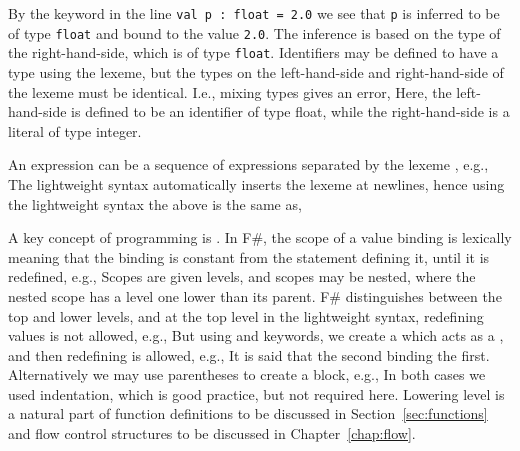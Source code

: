 By the  keyword in the line \lstinline!val p : float = 2.0! we see that \lstinline!p! is inferred to be of type \lstinline!float! and bound to the value \lstinline!2.0!. The inference is based on the type of the right-hand-side, which is of type \lstinline!float!.  Identifiers may be defined to have a type using the \lexeme{:} lexeme, but the types on the left-hand-side and right-hand-side of the \lexeme{=} lexeme must be identical. I.e., mixing types gives an error,
%
%
%
Here, the left-hand-side is defined to be an identifier of type float, while the right-hand-side is a literal of type integer.

An expression can be a sequence of expressions separated by the lexeme \lexeme{;}, e.g.,
%
%
The lightweight syntax automatically inserts the \lexeme{;} lexeme at newlines, hence using the lightweight syntax the above is the same as,
%
%

A key concept of programming is . In F\#, the scope of a value binding is lexically meaning that the binding is constant from the  statement defining it, until it is redefined, e.g.,
%
%
Scopes are given levels, and scopes may be nested, where the nested scope has a level one lower than its parent. F\# distinguishes between the top and lower levels, and at the top level in the lightweight syntax, redefining values is not allowed, e.g.,
%
%
But using  and  keywords, we create a  which acts as a , and then redefining is allowed, e.g.,
%
%
It is said that the second binding  the first.
Alternatively we may use parentheses to create a block, e.g.,
%
%
In both cases we used indentation, which is good practice, but not required here.  Lowering level is a natural part of function definitions to be discussed in Section~\ref{sec:functions} and flow control structures to be discussed in Chapter~\ref{chap:flow}.

